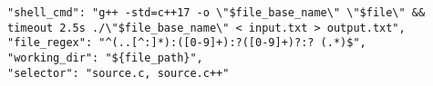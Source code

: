 \begin{verbatim}
"shell_cmd": "g++ -std=c++17 -o \"$file_base_name\" \"$file\" && timeout 2.5s ./\"$file_base_name\" < input.txt > output.txt",
"file_regex": "^(..[^:]*):([0-9]+):?([0-9]+)?:? (.*)$",
"working_dir": "${file_path}",
"selector": "source.c, source.c++"
\end{verbatim}
